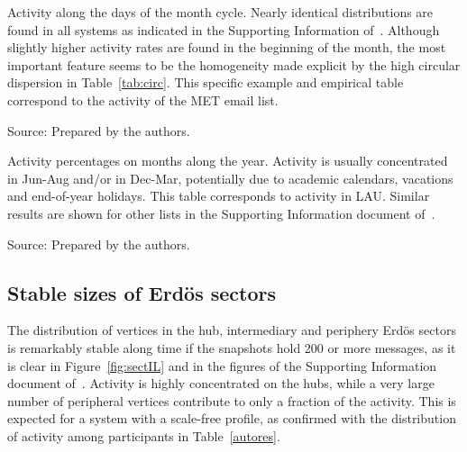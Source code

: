 								\FloatBarrier

								\begin{table}
								\caption{Activity along the days of the month cycle.
								Nearly identical distributions are found in all systems
									as indicated in the Supporting Information of~\cite{stab}. Although slightly higher activity rates are found in the beginning of the month, the most important feature seems to be the homogeneity made explicit by the high circular dispersion in Table~\ref{tab:circ}.
									This specific example and empirical table correspond to the activity of the MET email list.}
									\footnotesize
									
									\label{tab:min}
									\begin{flushleft}
											Source: Prepared by the authors.\
											\end{flushleft}
											\end{table}

											\begin{table}
												\caption{Activity percentages on months along the year. 	Activity is usually concentrated in Jun-Aug and/or in Dec-Mar, potentially due to academic calendars, vacations and end-of-year holidays. This table corresponds to activity in LAU. Similar results are shown for other lists in the Supporting Information document of~\cite{stab}.}
												\footnotesize
												
												\label{tab:min22}
												\begin{flushleft}
														Source: Prepared by the authors.\
														\end{flushleft}
														\end{table}


														\subsection{Stable sizes of Erd\"os sectors}\label{subsec:pih}

														The distribution of vertices in the hub, intermediary and periphery Erd\"os sectors is remarkably stable along time if the snapshots hold 200 or more messages,
														as it is clear in Figure~\ref{fig:sectIL} and in the figures of the Supporting Information document of~\cite{stab}.
														Activity is highly concentrated on the hubs, while a very large number of peripheral vertices contribute to only a fraction of the activity.
														This is expected for a system with a scale-free profile, as confirmed with the distribution of activity among participants in Table~\ref{autores}.


